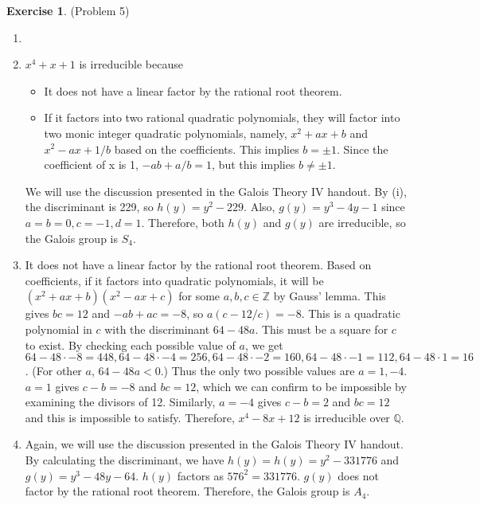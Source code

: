 \documentclass[12pt, psamsfonts]{amsart}
\theoremstyle{definition}
\newtheorem*{exer}{Exercise}
\theoremstyle{remark}
\numberwithin{equation}{section}
\begin{document}
\begin{exer}{(Problem 5)}
  \begin{enumerate}[label=(\alph*)]
    \item 
      \todo[inline,caption={}]{
      }
    \item
      $x^4 + x + 1$ is irreducible because
      \begin{itemize}
        \item
          It does not have a linear factor by the rational root theorem.
        \item
          If it factors into two rational quadratic polynomials, they will factor into two monic integer quadratic polynomials, namely, $x^2 + ax + b$ and $x^2 - ax + 1/b$ based on the coefficients.
          This implies $b = \pm 1$.
          Since the coefficient of x is 1, $-ab + a/b = 1$, but this implies $b \ne \pm 1$.
      \end{itemize}
      We will use the discussion presented in the Galois Theory IV handout.
      By (i), the discriminant is 229, so $h(y) = y^2 - 229$.
      Also, $g(y) = y^3 - 4y - 1$ since $a = b = 0, c = -1, d = 1$.
      Therefore, both $h(y)$ and $g(y)$ are irreducible, so the Galois group is $S_4$.
    \item
      It does not have a linear factor by the rational root theorem.
      Based on coefficients, if it factors into quadratic polynomials, it will be $(x^2 + ax + b)(x^2 - ax + c)$ for some $a, b, c \in \mathbb{Z}$ by Gauss' lemma.
      This gives $bc = 12$ and $-ab + ac = -8$, so $a(c - 12/c) = -8$.
      This is a quadratic polynomial in $c$ with the discriminant $64 - 48a$.
      This must be a square for $c$ to exist.
      By checking each possible value of $a$, we get $64 - 48 \cdot -8 = 448, 64 - 48 \cdot -4 = 256, 64 - 48 \cdot -2 = 160, 64 - 48 \cdot -1 = 112, 64 - 48 \cdot 1 = 16$.
      (For other $a$, $64 - 48a < 0$.)
      Thus the only two possible values are $a = 1, -4$.
      $a = 1$ gives $c - b = -8$ and $bc = 12$, which we can confirm to be impossible by examining the divisors of 12.
      Similarly, $a = -4$ gives $c - b = 2$ and $bc = 12$ and this is impossible to satisfy.
      Therefore, $x^4 - 8x + 12$ is irreducible over $\mathbb{Q}$.
    \item
      Again, we will use the discussion presented in the Galois Theory IV handout.
      By calculating the discriminant, we have $h(y) = h(y) = y^{2} - 331776$ and $g(y) = y^{3} - 48 y - 64$.
      $h(y)$ factors as $576^2 = 331776$.
      $g(y)$ does not factor by the rational root theorem.
      Therefore, the Galois group is $A_4$.
  \end{enumerate}
\end{exer}
\end{document}
